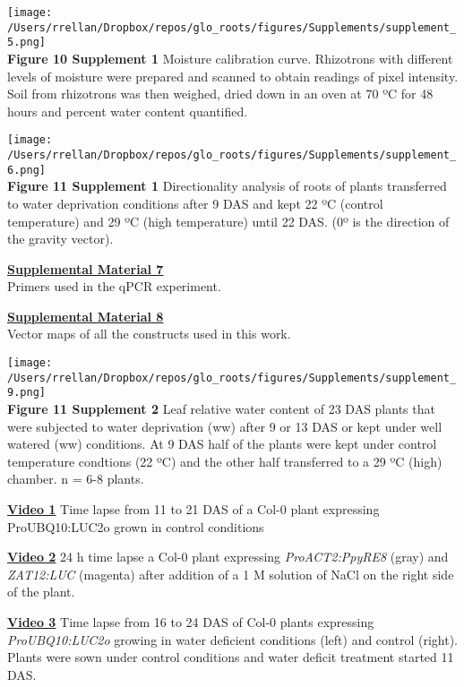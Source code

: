 \documentclass[]{article}
\begin{document}
\texttt{[image: /Users/rrellan/Dropbox/repos/glo\_roots/figures/Supplements/supplement\_5.png]}\\\textbf{Figure
10 Supplement 1} Moisture calibration curve. Rhizotrons with different
levels of moisture were prepared and scanned to obtain readings of pixel
intensity. Soil from rhizotrons was then weighed, dried down in an oven
at 70 ºC for 48 hours and percent water content quantified.

\texttt{[image: /Users/rrellan/Dropbox/repos/glo\_roots/figures/Supplements/supplement\_6.png]}\\\textbf{Figure
11 Supplement 1} Directionality analysis of roots of plants transferred
to water deprivation conditions after 9 DAS and kept 22 ºC (control
temperature) and 29 ºC (high temperature) until 22 DAS. (0º is the
direction of the gravity vector).

\textbf{\href{https://www.dropbox.com/s/hn1hhuttdby7y0j/supplement_7.csv?dl=0}{Supplemental
Material 7}}\\Primers used in the qPCR experiment.

\textbf{\href{https://www.dropbox.com/s/kg0r5df4nx3tjpy/supplement_8.zip?dl=0}{Supplemental
Material 8}}\\Vector maps of all the constructs used in this work.

\texttt{[image: /Users/rrellan/Dropbox/repos/glo\_roots/figures/Supplements/supplement\_9.png]}\\\textbf{Figure
11 Supplement 2} Leaf relative water content of 23 DAS plants that were
subjected to water deprivation (ww) after 9 or 13 DAS or kept under well
watered (ww) conditions. At 9 DAS half of the plants were kept under
control temperature condtions (22 ºC) and the other half transferred to
a 29 ºC (high) chamber. n = 6-8 plants.

\href{https://www.dropbox.com/s/sxjc04o0yj2faif/Video_1.avi?dl=0}{\textbf{Video
1}} Time lapse from 11 to 21 DAS of a Col-0 plant expressing
ProUBQ10:LUC2o grown in control conditions

\href{https://www.dropbox.com/s/11td4zmhcw8yty6/Video_2.avi?dl=0}{\textbf{Video
2}} 24 h time lapse a Col-0 plant expressing \emph{ProACT2:PpyRE8}
(gray) and \emph{ZAT12:LUC} (magenta) after addition of a 1 M solution
of NaCl on the right side of the plant.

\href{https://www.dropbox.com/s/x24x1uhvc8x0ou9/Video_3.avi?dl=0}{\textbf{Video
3}} Time lapse from 16 to 24 DAS of Col-0 plants expressing
\emph{ProUBQ10:LUC2o} growing in water deficient conditions (left) and
control (right). Plants were sown under control conditions and water
deficit treatment started 11 DAS.
\end{document}
